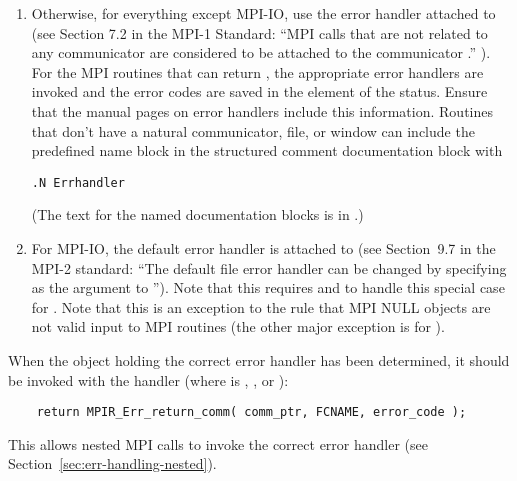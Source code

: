 \documentclass{article}
\begin{document}
\begin{enumerate}
\item Otherwise, for everything except MPI-IO, use the error handler attached
  to   
  (see Section 7.2 in the MPI-1 Standard: ``MPI calls that are not related to
  any communicator are considered to be attached to the communicator
  .'' ).  
  For the MPI routines that can return , the
appropriate error handlers are invoked and the error codes are saved
in the  element of the status.
  Ensure that the manual pages on error handlers
  include this information.  Routines that don't have a natural
communicator, file, or window can include the predefined name block
 in the structured comment documentation block with
\begin{verbatim}
.N Errhandler
\end{verbatim}
  (The text for the named documentation blocks is in
  .) 

\item For MPI-IO, the default error handler is attached to
   (see Section~9.7 in the MPI-2 standard: ``The default
  file error handler can be changed by specifying  as the
   argument to '').  Note that this
  requires  and
   to handle this special case for
  .  Note that this is an exception to the
  rule that MPI NULL objects are not valid input to MPI routines (the
  other major exception is for ).
\end{enumerate}

When the object holding the correct error handler has been determined, it
should be invoked with the 
 handler (where  is ,
, or ): %
\begin{verbatim}
    return MPIR_Err_return_comm( comm_ptr, FCNAME, error_code );
\end{verbatim}
This allows nested MPI calls to invoke the correct error handler (see
Section~\ref{sec:err-handling-nested}).  
\end{document}
